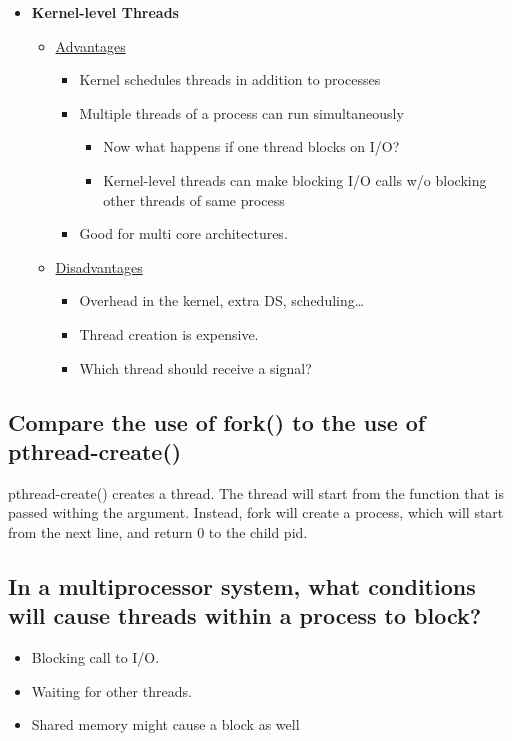 \documentclass[a4paper]{article}
\begin{document}
\begin{itemize}
  \item {\bf Kernel-level Threads}
  \begin{itemize}
    \item \underline{Advantages}
      \begin{itemize}
        \item Kernel schedules threads in addition to processes
        \item Multiple threads of a process can run simultaneously
          \begin{itemize}
            \item Now what happens if one thread blocks on I/O?
            \item Kernel-level threads can make blocking I/O calls w/o blocking other threads of same process
          \end{itemize}
        \item Good for multi core architectures.
      \end{itemize}
    \item \underline{Disadvantages}
      \begin{itemize}
        \item Overhead in the kernel, extra DS, scheduling\dots
        \item Thread creation is expensive.
        \item Which thread should receive a signal?
      \end{itemize}
  \end{itemize}
\end{itemize}
\subsection{Compare the use of fork() to the use of pthread-create()} %
\label{sub:Compare the use of fork() to the use of pthread_create()}
pthread-create() creates a thread. The thread will start from the function that is passed withing the argument. Instead, fork will create a process, which will start from the next line, and return 0 to the child pid.
\subsection{In a multiprocessor system, what conditions will cause threads within a process to block?} %
\label{sub:In a multiprocessor system, what conditions will cause threads within a process to block?}
\begin{itemize}
  \item Blocking call to I/O.
  \item Waiting for other threads.
  \item Shared memory might cause a block as well
\end{itemize}
\end{document}

